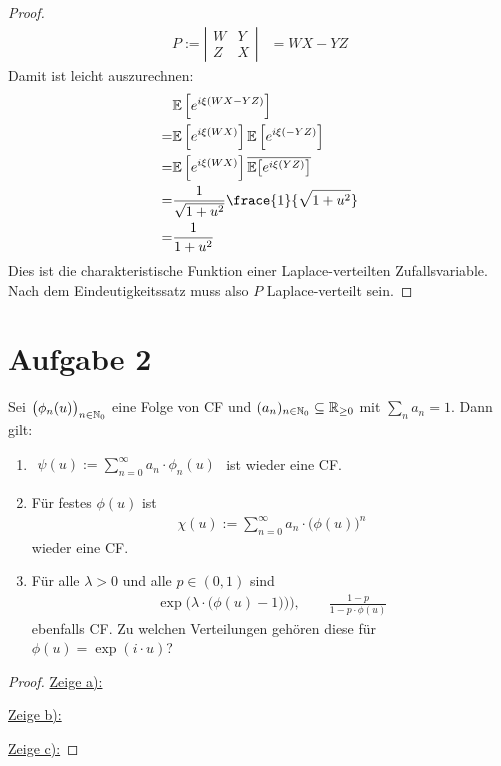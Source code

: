 \documentclass[12pt,a4paper]{article}
\begin{document}
\begin{proof}
	\begin{align*}
		P:=
		\left|\begin{array}{cc}
			W & Y \\
			Z & X
		\end{array}\right| &= WX-YZ
	\end{align*}
	Damit ist leicht auszurechnen:
	\begin{align*}
	 	&\E\left[e^{i\xi(WX-YZ)}\right]\\
	 	=&\E\left[e^{i\xi(WX)}\right]\E\left[e^{i\xi(-YZ)}\right]\\
	 	=&\E\left[e^{i\xi(WX)}\right]\overline{\E\big[e^{i\xi(YZ)}\big]}\\
		=&\frac{1}{\sqrt{1+u^2}}\frace{1}{\sqrt{1+u^2}}\\
		=&\frac{1}{1+u^2}
	\end{align*}
	Dies ist die charakteristische Funktion einer Laplace-verteilten Zufallsvariable.
	Nach dem Eindeutigkeitssatz muss also $P$ Laplace-verteilt sein.
\end{proof}

\section*{Aufgabe 2}
Sei $\big(\phi_n(u)\big)_{n\in\mathbb{N}_0}$ eine Folge von CF und $(a_n)_{n\in\mathbb{N}_0}\subseteq\mathbb{R}_{\geq0}$ mit $\sum\limits_n a_n=1$.
Dann gilt:
\begin{enumerate}[label=\alph*)]
	\item $\begin{aligned}
		\psi(u):=\sum\limits_{n=0}^\infty a_n\cdot\phi_n(u)
	\end{aligned}$ ist wieder eine CF.
	\item Für festes $\phi(u)$ ist 
	\begin{align*}
		\chi(u):=\sum\limits_{n=0}^\infty a_n\cdot\big(\phi(u)\big)^n
	\end{align*}
	wieder eine CF.
	\item Für alle $\lambda>0$ und alle $p\in(0,1)$ sind
	\begin{align*}
		\exp\Big(\lambda\cdot\big(\phi(u)-1)\big)\Big),\qquad
		\frac{1-p}{1-p\cdot\phi(u)}
	\end{align*}
	ebenfalls CF. Zu welchen Verteilungen gehören diese für $\phi(u)=\exp(i\cdot u)$?
\end{enumerate} 

\begin{proof}
	\underline{Zeige a):}
	
	\underline{Zeige b):}
	
	\underline{Zeige c):}
		
\end{proof}
\end{document}
